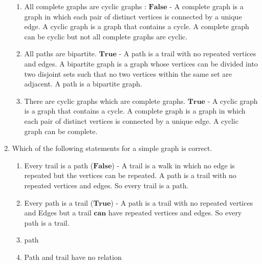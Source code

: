 \documentclass[a3paper,12pt]{extarticle} %
\begin{document}
\begin{enumerate}
\begin{enumerate}
        \item All complete graphs are cyclic graphs : \( \textbf{False} \) - A complete graph is a graph in which each pair of distinct vertices is connected by a unique edge. A cyclic graph is a graph that contains a cycle. A complete graph can be cyclic but not all complete graphs are cyclic.
        \item All paths are bipartite. \( \textbf{True} \) - A path is a trail with no repeated vertices and edges. A bipartite graph is a graph whose vertices can be divided into two disjoint sets such that no two vertices within the same set are adjacent. A path is a bipartite graph.
        \item There are cyclic graphs which are complete graphs. \( \textbf{True} \) - A cyclic graph is a graph that contains a cycle. A complete graph is a graph in which each pair of distinct vertices is connected by a unique edge. A cyclic graph can be complete.
    \end{enumerate}
    \item Which of the following statements for a simple graph is correct.
    \begin{enumerate}
        \item Every trail is a path (\(\textbf{False}\)) - A trail is a walk in which no edge is repeated but the vertices can be repeated. A path is a trail with no repeated vertices and edges. So every trail is a path.
        \item Every path is a trail (\(\textbf{True}\)) - A path is a trail with no repeated vertices and Edges but a trail \(\textbf{can}\) have repeated vertices and edges. So every path is a trail.
        \item path
        \item Path and trail have no relation
    \end{enumerate}
\end{enumerate}
\end{document}
